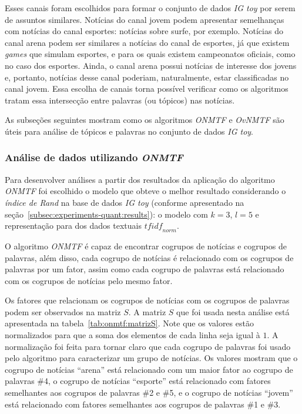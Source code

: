 \documentclass[
    12pt,                %
    oneside,            %
    a4paper,            %
    english,            %
    brazil                %
    ]{abntex2ppgsi}
\begin{document}
Esses canais foram escolhidos para formar o conjunto de dados \textit{IG toy} por serem de assuntos similares. Notícias do canal jovem podem apresentar semelhanças com notícias do canal esportes: notícias sobre surfe, por exemplo. Notícias do canal arena podem ser similares a notícias do canal de esportes, já que existem \textit{games} que simulam esportes, e para os quais existem campeonatos oficiais, como no caso dos esportes. Ainda, o canal arena possui notícias de interesse dos jovens e, portanto, notícias desse canal poderiam, naturalmente, estar classificadas no canal jovem. Essa escolha de canais torna possível verificar como os algoritmos tratam essa intersecção entre palavras (ou tópicos) nas notícias.

As subseções seguintes mostram como os algoritmos \textit{ONMTF} e \textit{OvNMTF} são úteis para análise de tópicos e palavras no conjunto de dados \textit{IG toy}.

\subsubsection{Análise de dados utilizando \textit{ONMTF}}

Para desenvolver análises a partir dos resultados da aplicação do algoritmo \textit{ONMTF} foi escolhido o modelo que obteve o melhor resultado considerando o \textit{índice de Rand} na base de dados \textit{IG toy} (conforme apresentado na seção~\ref{subsec:experiments-quant:results}): o modelo com $k = 3$, $l = 5$ e representação para dos dados textuais $\textit{tfidf}_{norm}$.

O algoritmo \textit{ONMTF} é capaz de encontrar cogrupos de notícias e cogrupos de palavras, além disso, cada cogrupo de notícias é relacionado com os cogrupos de palavras por um fator, assim como cada cogrupo de palavras está relacionado com os cogrupos de notícias pelo mesmo fator.

Os fatores que relacionam os cogrupos de notícias com os cogrupos de palavras podem ser observados na matriz $S$. A matriz $S$ que foi usada nesta análise está apresentada na tabela~\ref{tab:onmtf:matrizS}. Note que os valores estão normalizados para que a soma dos elementos de cada linha seja igual à $1$. A normalização foi feita para tornar claro que cada cogrupo de palavras foi usado pelo algoritmo para caracterizar um grupo de notícias. Os valores mostram que o cogrupo de notícias ``arena'' está relacionado com um maior fator ao cogrupo de palavras \#4, o cogrupo de notícias ``esporte'' está relacionado com fatores semelhantes aos cogrupos de palavras \#2 e \#5, e o cogrupo de notícias ``jovem'' está relacionado com fatores semelhantes aos cogrupos de palavras \#1 e \#3.
\end{document}

